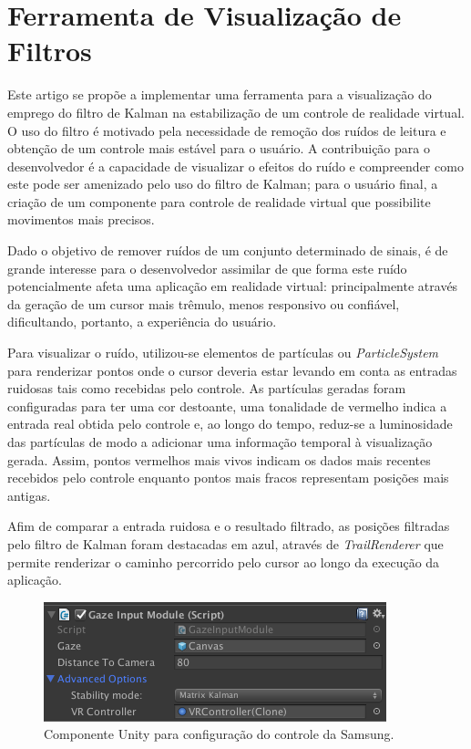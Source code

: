 \documentclass[conference]{IEEEtran}
\begin{document}
\section{Ferramenta de Visualização de Filtros} \label{sec:viztool}

Este artigo se propõe a implementar uma ferramenta para a visualização do emprego do filtro de Kalman na estabilização de um controle de realidade virtual. O uso do filtro é motivado pela necessidade de remoção dos ruídos de leitura e obtenção de um controle mais estável para o usuário. A contribuição para o desenvolvedor é a capacidade de visualizar o efeitos do ruído e compreender como este pode ser amenizado pelo uso do filtro de Kalman; para o usuário final, a criação de um componente para controle de realidade virtual que possibilite movimentos mais precisos.

Dado o objetivo de remover ruídos de um conjunto determinado de sinais, é de grande interesse para o desenvolvedor assimilar de que forma este ruído potencialmente afeta uma aplicação em realidade virtual: principalmente através da geração de um cursor mais trêmulo, menos responsivo ou confiável, dificultando, portanto, a experiência do usuário.

Para visualizar o ruído, utilizou-se elementos de partículas ou \textit{ParticleSystem} para renderizar pontos onde o cursor deveria estar levando em conta as entradas ruidosas tais como recebidas pelo controle. As partículas geradas foram configuradas para ter uma cor destoante, uma tonalidade de vermelho indica a entrada real obtida pelo controle e, ao longo do tempo, reduz-se a luminosidade das partículas de modo a adicionar uma informação temporal à visualização gerada. Assim, pontos vermelhos mais vivos indicam os dados mais recentes recebidos pelo controle enquanto pontos mais fracos representam posições mais antigas.

Afim de comparar a entrada ruidosa e o resultado filtrado, as posições filtradas pelo filtro de Kalman foram destacadas em azul, através de \textit{TrailRenderer} que permite renderizar o caminho percorrido pelo cursor ao longo da execução da aplicação.

\begin{figure}[h!]
\centering
\includegraphics[width=\linewidth]{images/controller_input.png}
\caption{Componente Unity para configuração do controle da Samsung.}
\label{fig:controllercomponent}
\end{figure}
\end{document}
